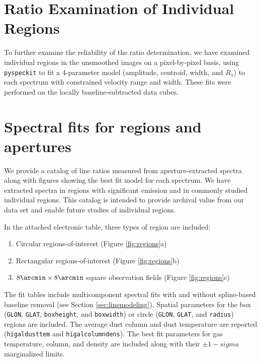 
\section{Ratio Examination of Individual Regions}
To further examine the reliability of the ratio determination, we have examined
individual regions in the unsmoothed images on a pixel-by-pixel basis, using
\texttt{pyspeckit} to fit a 4-parameter model (amplitude, centroid, width, and
$R_1$) to each spectrum with constrained velocity range and width.  These fits
were performed on the locally baseline-subtracted data cubes.

\section{Spectral fits for regions and apertures}
We provide a catalog of line ratios measured from aperture-extracted spectra
along with figures showing the best fit model for each spectrum.  We have
extracted spectra in regions with significant \para emission and in commonly
studied individual regions.  This catalog is intended to provide archival value
from our data set and enable future studies of individual regions.

In the attached electronic table, three types of region are included: 
\begin{enumerate}
    \item Circular regions-of-interest (Figure \ref{fig:regions}a)
    \item Rectangular regions-of-interest (Figure \ref{fig:regions}b)
    \item $8\arcmin \times 8\arcmin$ square observation fields (Figure \ref{fig:regions}c)
\end{enumerate}
The fit tables include multicomponent spectral fits with and without
spline-based baseline removal (see Section \ref{sec:linemodeling}).
Spatial parameters for the box (\texttt{GLON}, \texttt{GLAT},
\texttt{boxheight}, and \texttt{boxwidth}) or circle (\texttt{GLON},
\texttt{GLAT}, and \texttt{radius}) regions are included.  The average dust
column and dust temperature are reported (\texttt{higaldusttem} and
\texttt{higalcolumndens}).  The best fit parameters for gas temperature, \para
column, and \hh density are included along with their $\pm1-sigma$ marginalized
limits.


